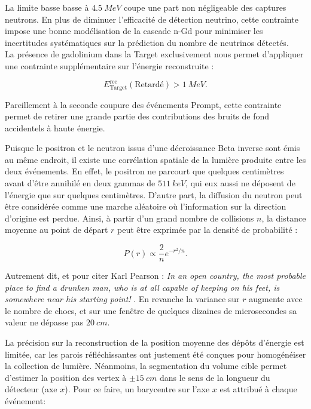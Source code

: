 La limite basse basse à $\SI{4.5}{MeV}$ coupe une part non négligeable des captures neutrons. En plus de diminuer l'efficacité de détection neutrino, cette contrainte impose une bonne modélisation de la cascade n-Gd pour minimiser les incertitudes systématiques sur la prédiction du nombre de neutrinos détectés.\\

La présence de gadolinium dans la Target exclusivement nous permet d'appliquer une contrainte supplémentaire sur l'énergie reconstruite :

\begin{equation}
    E^\textrm{rec}_\textrm{Target}(\textrm{Retardé}) > \SI{1}{MeV}.
\end{equation}

\bigbreak

Pareillement à la seconde coupure des événements Prompt, cette contrainte permet de retirer une grande partie des contributions des bruits de fond accidentels à haute énergie.

\bigbreak

Puisque le positron et le neutron issus d'une décroissance Beta inverse sont émis au même endroit, il existe une corrélation spatiale de la lumière produite entre les deux événements. En effet, le positron ne parcourt que quelques centimètres avant d'être annihilé en deux gammas de $\SI{511}{keV}$, qui eux aussi ne déposent de l'énergie que sur quelques centimètres. D'autre part, la diffusion du neutron peut être considérée comme une marche aléatoire où l'information sur la direction d'origine est perdue. Ainsi, à partir d'un grand nombre de collisions $n$, la distance moyenne au point de départ $r$ peut être exprimée par la densité de probabilité \cite{doi:10.1080/14786449908621276}:

\begin{equation}
    P(r) \propto \frac{2}{n} e^{-r^2/n}.
\end{equation}

Autrement dit, et pour citer Karl Pearson : \og \textit{In an open country, the most probable place to find a drunken man, who is at all capable of keeping on his feet, is somewhere near his starting point!} \fg{} \cite{PEARSON:1905fu}. En revanche la variance sur $r$ augmente avec le nombre de chocs, et sur une fenêtre de quelques dizaines de microsecondes sa valeur ne dépasse pas $\SI{20}{cm}$.\\

\bigbreak

La précision sur la reconstruction de la position moyenne des dépôts d'énergie est limitée, car les parois réfléchissantes ont justement été conçues pour homogénéiser la collection de lumière. Néanmoins, la segmentation du volume cible permet d'estimer la position des vertex à $\pm \SI{15}{cm}$ dans le sens de la longueur du détecteur (axe $x$). Pour ce faire, un barycentre sur l'axe $x$ est attribué à chaque événement:

